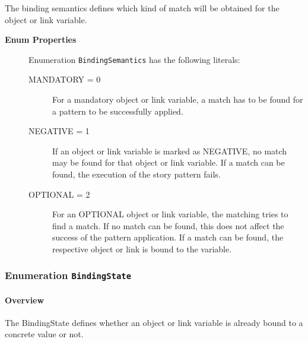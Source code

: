 			
The binding semantics defines which kind of match will be obtained for the object or link variable.	
		
	


\begin{description}

	\item[\textbf{Enum Properties}] Enumeration \texttt{BindingSemantics} has the following literals:

	\begin{description}
		
		\item[MANDATORY = 0]
		\hspace{\fill}
		\nopagebreak
		
For a mandatory object or link variable, a match has to be found for a pattern to be successfully applied.	

		\item[NEGATIVE = 1]
		\hspace{\fill}
		\nopagebreak
		
If an object or link variable is marked as NEGATIVE, no match may be found for that object or link variable. If a match can be found, the execution of the story pattern fails.	

		\item[OPTIONAL = 2]
		\hspace{\fill}
		\nopagebreak
		
For an OPTIONAL object or link variable, the matching tries to find a match. If no match can be found, this does not affect the success of the pattern application. If a match can be found, the respective object or link is bound to the variable.	
 
	\end{description}

\end{description}



\subsubsection{\Large{Enumeration \bfseries \texttt{BindingState}\normalfont}}
\label{cls:storydiagrams::patterns::BindingState} 
\paragraph{Overview}
	
			
The BindingState defines whether an object or link variable is already bound to a concrete value or not.	
		
